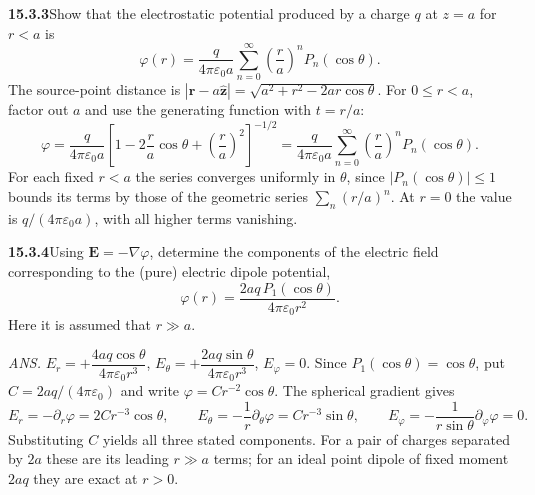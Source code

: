 \par\bigskip
\noindent\textbf{15.3.3}\quad Show that the electrostatic potential
produced by a charge $q$ at $z=a$ for $r<a$ is
\[
\varphi(r)=\frac{q}{4\pi\varepsilon_{0}a}
\sum_{n=0}^{\infty}\left(\frac{r}{a}\right)^{n}P_{n}(\cos\theta).
\]
\solution
The source-point distance is
$|\mathbf r-a\hat{\mathbf z}|=\sqrt{a^2+r^2-2ar\cos\theta}$.
For $0\le r<a$, factor out $a$ and use the generating function with
$t=r/a$:
\[
\varphi=\frac{q}{4\pi\varepsilon_0a}
\left[1-2\frac ra\cos\theta+\left(\frac ra\right)^2\right]^{-1/2}
=\boxed{\frac{q}{4\pi\varepsilon_0a}
\sum_{n=0}^\infty\left(\frac ra\right)^nP_n(\cos\theta)}.
\]
For each fixed $r<a$ the series converges uniformly in $\theta$, since
$|P_n(\cos\theta)|\le1$ bounds its terms by those of the geometric
series $\sum_n(r/a)^n$. At $r=0$ the value is
$q/(4\pi\varepsilon_0a)$, with all higher terms vanishing.

\par\bigskip
\noindent\textbf{15.3.4}\quad Using $\mathbf{E}=-\nabla\varphi$,
determine the components of the electric field corresponding to the
(pure) electric dipole potential,
\[
\varphi(r)=\frac{2aq\,P_{1}(\cos\theta)}{4\pi\varepsilon_{0}r^{2}}.
\]
Here it is assumed that $r\gg a$.
\par\nobreak\hfill\emph{ANS.}\enspace
$E_{r}=+\dfrac{4aq\cos\theta}{4\pi\varepsilon_{0}r^{3}}$,\quad
$E_{\theta}=+\dfrac{2aq\sin\theta}{4\pi\varepsilon_{0}r^{3}}$,\quad
$E_{\varphi}=0$.
\solution
Since $P_1(\cos\theta)=\cos\theta$, put $C=2aq/(4\pi\varepsilon_0)$
and write $\varphi=C r^{-2}\cos\theta$.
The spherical gradient gives
\[
E_r=-\partial_r\varphi=2Cr^{-3}\cos\theta,\qquad
E_\theta=-\frac1r\partial_\theta\varphi=Cr^{-3}\sin\theta,
\qquad E_\varphi=-\frac1{r\sin\theta}\partial_\varphi\varphi=0.
\]
Substituting $C$ yields all three stated components. For a pair of
charges separated by $2a$ these are its leading $r\gg a$ terms;
for an ideal point dipole of fixed moment $2aq$ they are exact at $r>0$.


